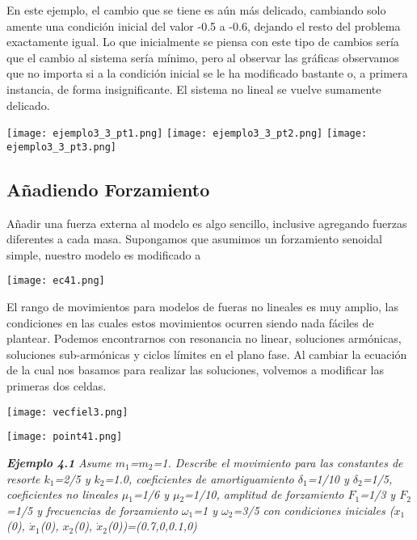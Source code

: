 \documentclass{article}
\begin{document}
En este ejemplo, el cambio que se tiene es aún más delicado, cambiando solo amente una condición inicial del valor -0.5 a -0.6, dejando el resto del problema exactamente igual. Lo que inicialmente se piensa con este tipo de cambios sería que el cambio al sistema sería mínimo, pero al observar las gráficas observamos que no importa si a la condición inicial se le ha modificado bastante o, a primera instancia, de forma insignificante. El sistema no lineal se vuelve sumamente delicado.

\begin{center}
\texttt{[image: ejemplo3\_3\_pt1.png]}
\texttt{[image: ejemplo3\_3\_pt2.png]}
\texttt{[image: ejemplo3\_3\_pt3.png]}
\end{center}

\subsection{Añadiendo Forzamiento}
Añadir una fuerza externa al modelo es algo sencillo, inclusive agregando fuerzas diferentes a cada masa. Supongamos que asumimos un forzamiento senoidal simple, nuestro modelo es modificado a

\begin{center}
\texttt{[image: ec41.png]}
\end{center}

El rango de movimientos para modelos de fueras no lineales es muy amplio, las condiciones en las cuales estos movimientos ocurren siendo nada fáciles de plantear. Podemos encontrarnos con resonancia no linear, soluciones armónicas, soluciones sub-armónicas y ciclos límites en el plano fase. Al cambiar la ecuación de la cual nos basamos para realizar las soluciones, volvemos a modificar las primeras dos celdas.

\begin{center}
\texttt{[image: vecfiel3.png]}
\end{center}

\begin{center}
\texttt{[image: point41.png]}
\end{center}

\textbf{\textit{Ejemplo 4.1}}
\textit{Asume $m_1$=$m_2$=1. Describe el movimiento para las constantes de resorte $k_1$=2/5 y $k_2$=1.0, coeficientes de amortiguamiento $\delta$$_1$=1/10 y $\delta$$_2$=1/5, coeficientes no lineales $\mu$$_1$=1/6 y $\mu$$_2$=1/10, amplitud de forzamiento $F_1$=1/3 y $F_2$=1/5 y frecuencias de forzamiento $\omega$$_1$=1 y $\omega$$_2$=3/5 con condiciones iniciales ($x_1$(0), $\dot{x}_1$(0), $x_2$(0), $\dot{x}_2$(0))=(0.7,0,0.1,0)}
\end{document}
